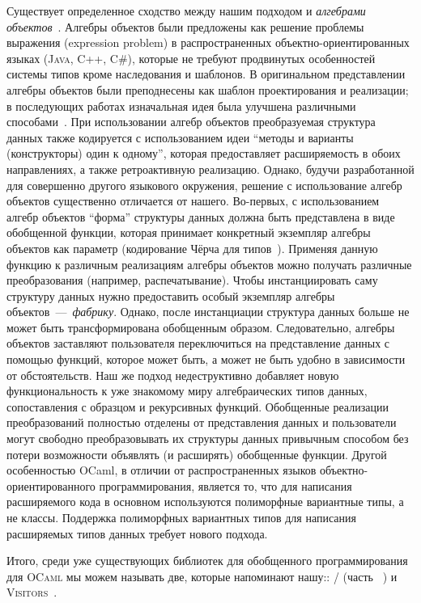 Существует определенное сходство между нашим подходом и \emph{алгебрами объектов}~\cite{ObjectAlgebras}. Алгебры объектов были предложены как решение проблемы выражения (expression problem) в распространенных объектно-ориентированных языках  (\textsc{Java}, \textsc{C++}, \textsc{C\#}), которые не требуют продвинутых особенностей системы типов кроме наследования и шаблонов. В оригинальном представлении алгебры объектов были преподнесены как шаблон проектирования и реализации; в последующих работах изначальная идея была улучшена различными способами~\cite{ObjectAlgebrasAttribute,ObjectAlgebrasSYB}. При использовании алгебр объектов преобразуемая структура данных также кодируется с использованием идеи ``методы и варианты (конструкторы) один к одному'', которая предоставляет расширяемость в обоих направлениях, а также ретроактивную реализацию. Однако, будучи  разработанной для совершенно другого языкового окружения, решение с использование алгебр объектов существенно отличается от нашего. Во-первых, с использованием алгебр объектов ``форма'' структуры данных должна быть представлена в виде обобщенной функции, которая принимает конкретный экземпляр алгебры объектов как параметр (кодирование Чёрча для типов~\cite{Hinze}). Применяя данную функцию к различным реализациям алгебры объектов можно получать различные преобразования (например, распечатывание). Чтобы инстанциировать саму структуру данных нужно предоставить особый экземпляр алгебры объектов~---~\emph{фабрику}. Однако, после инстанциации структура данных больше не может быть трансформирована обобщенным образом. Следовательно, алгебры объектов заставляют пользователя переключиться на представление данных с помощью функций, которое может быть, а может не быть удобно в зависимости от обстоятельств.  Наш же подход недеструктивно добавляет новую функциональность к уже знакомому миру алгебраических типов данных, сопоставления с образцом и рекурсивных функций. Обобщенные реализации преобразований полностью отделены от представления данных и пользователи могут свободно преобразовывать их структуры данных привычным способом  без потери возможности объявлять (и расширять) обобщенные функции. Другой особенностью OCaml, в отличии от распространенных языков объектно-ориентированного программирования, является то, что для написания расширяемого кода в основном используются полиморфные вариантные типы, а не классы. Поддержка полиморфных вариантных типов для написания расширяемых типов данных требует нового подхода.


Итого, среди уже существующих библиотек для обобщенного программирования для \textsc{OCaml} мы можем называть две, которые напоминают нашу:: / (часть ~\cite{PPXLib}) и \textsc{Visitors}~\cite{Visitors}.

